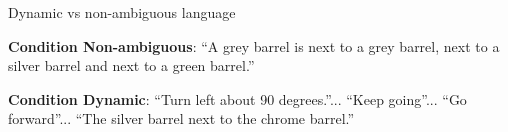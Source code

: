 \documentclass[xcolor=table]{beamer}
\begin{document}
{

\begin{frame}{Dynamic vs non-ambiguous language}
    \begin{center}


        {\scriptsize
        \textbf{Condition Non-ambiguous}: ``A grey barrel is next to a grey barrel, next to a silver barrel and
        next to a green barrel.''

        \textbf{Condition Dynamic}: ``Turn left about 90 degrees.''... ``Keep
        going''... ``Go forward''... ``The silver barrel next to the chrome
        barrel.''
        }


    \end{center}

\end{frame}
}
\end{document}
